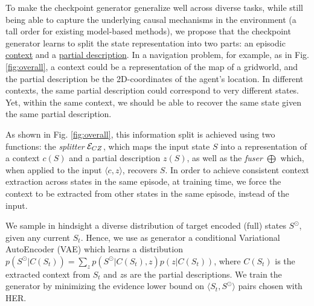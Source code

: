 

To make the checkpoint generator generalize well across diverse tasks, while still being able to capture the underlying causal mechanisms in the environment (a tall order for  existing model-based methods), we propose that the checkpoint generator learns to split the state representation into two parts: an episodic \underline{context} and a \underline{partial description}. In a navigation problem, for example, as in Fig. \ref{fig:overall}, a context could be a representation of the map of a gridworld, and the partial description be the 2D-coordinates of the agent's location. In different contexts, the same partial description could correspond to very different states. Yet, within the same context, we should be able to recover the same state given the same partial description.

As shown in Fig. \ref{fig:overall}, this information split  is achieved using two functions: the \textit{splitter} $\mathcal{E}_{CZ}$, which maps the input state $S$ into a representation of a context $c(S)$ and a partial description $z(S)$, as well as the \textit{fuser} $\bigoplus$ which, when applied to the input $\langle c, z \rangle$, recovers $S$. In order to achieve consistent context extraction across states in the same episode, at training time, we force the context to be extracted from other states in the same episode, instead of the input.



We sample in hindsight a diverse distribution of target encoded (full) states $S^{\odot}$, given any current $S_t$. Hence, we use as generator a conditional Variational AutoEncoder (VAE) \citep{sohn2015learning} which learns a distribution $p(S^{\odot} | C(S_t)) = \sum_z{p(S^{\odot} | C(S_t), z) p(z | C(S_t))}$, where $C(S_t)$ is the extracted context from $S_t$ and $z$s are the partial descriptions. We train the generator by minimizing the evidence lower bound on $\langle S_t, S^{\odot} \rangle$ pairs chosen with HER.

